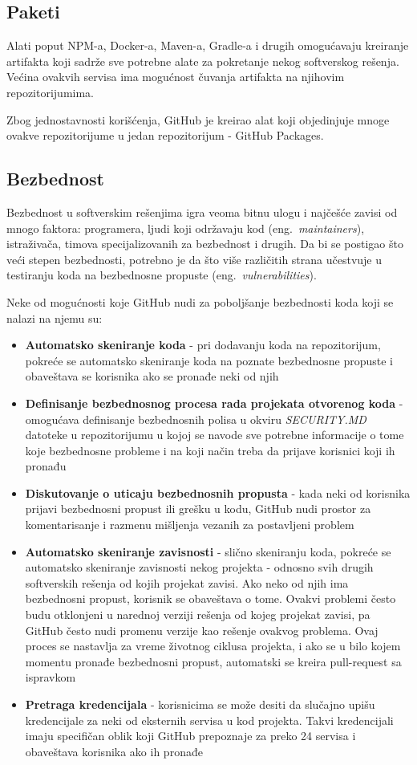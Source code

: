 \documentclass[12pt]{report}
\begin{document}
\subsection{Paketi}
Alati poput NPM-a, Docker-a, Maven-a, Gradle-a i drugih omogućavaju kreiranje artifakta koji sadrže sve potrebne alate za pokretanje nekog softverskog rešenja. Većina ovakvih servisa ima mogućnost čuvanja artifakta na njihovim repozitorijumima.

Zbog jednostavnosti korišćenja, GitHub je kreirao alat koji objedinjuje mnoge ovakve repozitorijume u jedan repozitorijum - GitHub Packages.

\subsection{Bezbednost}
Bezbednost u softverskim rešenjima igra veoma bitnu ulogu i najčešće zavisi od mnogo faktora: programera, ljudi koji održavaju kod (eng.\ \textit{maintainers}), istraživača, timova specijalizovanih za bezbednost i drugih. Da bi se postigao što veći stepen bezbednosti, potrebno je da što više različitih strana učestvuje u testiranju koda na bezbednosne propuste (eng.\ \textit{vulnerabilities}).

Neke od mogućnosti koje GitHub nudi za poboljšanje bezbednosti koda koji se nalazi na njemu su:

\begin{itemize}
    \item \textbf{Automatsko skeniranje koda} - pri dodavanju koda na repozitorijum, pokreće se automatsko skeniranje koda na poznate bezbednosne propuste i obaveštava se korisnika ako se pronađe neki od njih
    \item \textbf{Definisanje bezbednosnog procesa rada projekata otvorenog koda} - omogućava definisanje bezbednosnih polisa u okviru \textit{SECURITY.MD} datoteke u repozitorijumu u kojoj se navode sve potrebne informacije o tome koje bezbednosne probleme i na koji način treba da prijave korisnici koji ih pronađu
    \item \textbf{Diskutovanje o uticaju bezbednosnih propusta} - kada neki od korisnika prijavi bezbednosni propust ili grešku u kodu, GitHub nudi prostor za komentarisanje i razmenu mišljenja vezanih za postavljeni problem
    \item \textbf{Automatsko skeniranje zavisnosti} - slično skeniranju koda, pokreće se automatsko skeniranje zavisnosti nekog projekta - odnosno svih drugih softverskih rešenja od kojih projekat zavisi. Ako neko od njih ima bezbednosni propust, korisnik se obaveštava o tome. Ovakvi problemi često budu otklonjeni u narednoj verziji rešenja od kojeg projekat zavisi, pa GitHub često nudi promenu verzije kao rešenje ovakvog problema. Ovaj proces se nastavlja za vreme životnog ciklusa projekta, i ako se u bilo kojem momentu pronađe bezbednosni propust, automatski se kreira pull-request sa ispravkom
    \item \textbf{Pretraga kredencijala} - korisnicima se može desiti da slučajno upišu kredencijale za neki od eksternih servisa u kod projekta. Takvi kredencijali imaju specifičan oblik koji GitHub prepoznaje za preko 24 servisa i obaveštava korisnika ako ih pronađe
\end{itemize}
\end{document}
